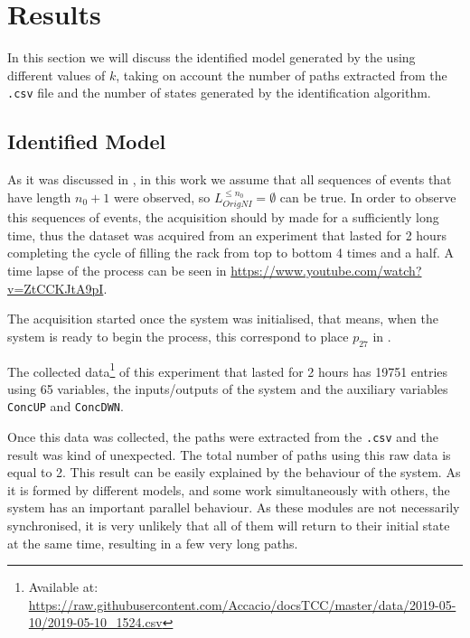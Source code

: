 \newcommand{\colvec}[2][1]{%
  \scalebox{#1}{%
    \renewcommand{\arraystretch}{.7}%
    $\begin{bmatrix}#2\end{bmatrix}$%
  }
}
\chapter{Results}
\label{cha:results}
In this section we will discuss the identified model generated by the
 using different values of $k$, taking
on account the number of paths extracted from the \verb|.csv| file and the
number of states generated by the identification algorithm.

\section{Identified Model}
As it was discussed in , in this work we assume that all
sequences of events that have length $n_0+1$ were observed, so 
$L_{OrigNI}^{\leq n_0}=\emptyset$ can be true. In order to observe this
sequences of events, the acquisition should by made for a sufficiently
long time, thus the dataset was acquired from an experiment that lasted for 2
hours completing the cycle of filling the rack from top to bottom  4 times and a
half. A time lapse of the process can be seen in
\url{https://www.youtube.com/watch?v=ZtCCKJtA9pI}.

The acquisition started once the system was initialised, that means,
when the system is ready to begin the process, this correspond to place
\hyperlink{partialTable:p27}{$p_{27}$} in .

The collected data\footnote{Available at:
  \url{https://raw.githubusercontent.com/Accacio/docsTCC/master/data/2019-05-10/2019-05-10_1524.csv}}
of this experiment that lasted for 2 hours has 19751 entries using 65
variables, the inputs\slash outputs of the system and the auxiliary variables
\verb|ConcUP| and \verb|ConcDWN|.

Once this data was collected, the paths were extracted from the \verb|.csv| and the
result was kind of unexpected. The total number of paths using this raw data is equal to
2. This result can be easily explained by the behaviour of the system. As it is
formed by different models, and some work simultaneously with others, the system
has an important parallel behaviour. As these modules are not necessarily
synchronised, it is very unlikely that all of them will return to their initial
state at the same time, resulting in a few very long paths. 


